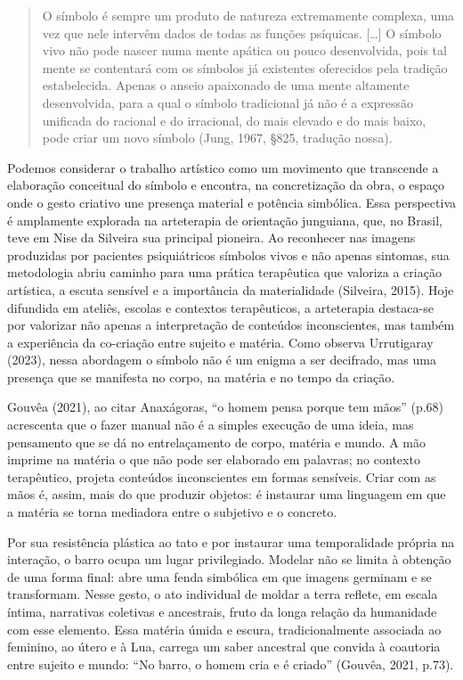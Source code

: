 \begin{quote}
  O símbolo é sempre um produto de natureza extremamente complexa, uma vez que nele intervêm dados de todas as funções psíquicas. […] O símbolo vivo não pode nascer numa mente apática ou pouco desenvolvida, pois tal mente se contentará com os símbolos já existentes oferecidos pela tradição estabelecida. Apenas o anseio apaixonado de uma mente altamente desenvolvida, para a qual o símbolo tradicional já não é a expressão unificada do racional e do irracional, do mais elevado e do mais baixo, pode criar um novo símbolo (Jung, 1967, §825, tradução nossa).
\end{quote}

Podemos considerar o trabalho artístico como um movimento que transcende a elaboração conceitual do símbolo e encontra, na concretização da obra, o espaço onde o gesto criativo une presença material e potência simbólica. Essa perspectiva é amplamente explorada na arteterapia de orientação junguiana, que, no Brasil, teve em Nise da Silveira sua principal pioneira. Ao reconhecer nas imagens produzidas por pacientes psiquiátricos símbolos vivos e não apenas sintomas, sua metodologia abriu caminho para uma prática terapêutica que valoriza a criação artística, a escuta sensível e a importância da materialidade (Silveira, 2015). Hoje difundida em ateliês, escolas e contextos terapêuticos, a arteterapia destaca-se por valorizar não apenas a interpretação de conteúdos inconscientes, mas também a experiência da co-criação entre sujeito e matéria. Como observa Urrutigaray (2023), nessa abordagem o símbolo não é um enigma a ser decifrado, mas uma presença que se manifesta no corpo, na matéria e no tempo da criação.

Gouvêa (2021), ao citar Anaxágoras, “o homem pensa porque tem mãos” (p.68) acrescenta que o fazer manual não é a simples execução de uma ideia, mas pensamento que se dá no entrelaçamento de corpo, matéria e mundo. A mão imprime na matéria o que não pode ser elaborado em palavras; no contexto terapêutico, projeta conteúdos inconscientes em formas sensíveis. Criar com as mãos é, assim, mais do que produzir objetos: é instaurar uma linguagem em que a matéria se torna mediadora entre o subjetivo e o concreto.

Por sua resistência plástica ao tato e por instaurar uma temporalidade própria na interação, o barro ocupa um lugar privilegiado. Modelar não se limita à obtenção de uma forma final: abre uma fenda simbólica em que imagens germinam e se transformam. Nesse gesto, o ato individual de moldar a terra reflete, em escala íntima, narrativas coletivas e ancestrais, fruto da longa relação da humanidade com esse elemento. Essa matéria úmida e escura, tradicionalmente associada ao feminino, ao útero e à Lua, carrega um saber ancestral que convida à coautoria entre sujeito e mundo: “No barro, o homem cria e é criado” (Gouvêa, 2021, p.73).

